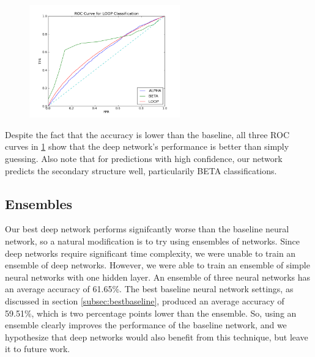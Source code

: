\documentclass[letterpaper,twocolumn,12pt]{article}
\begin{document}
\begin{figure}[ht!]
\centering
\includegraphics[width=65mm]{results/ROC_all_final_deep_net_100it.png}
\caption{}
\label{fig:roc}
\end{figure}

Despite the fact that the accuracy is lower than the baseline, all three ROC curves in \ref{fig:roc} show that the deep network's performance is better than simply guessing.
Also note that for predictions with high confidence, our network predicts the secondary structure well, particularily BETA classifications.

\subsection{Ensembles}
Our best deep network performs signifcantly worse than the baseline neural network, so a natural modification is to try using ensembles of networks.
Since deep networks require significant time complexity, we were unable to train an ensemble of deep networks.
However, we were able to train an ensemble of simple neural networks with one hidden layer.
An ensemble of three neural networks has an average accuracy of 61.65\%.
The best baseline neural network settings, as discussed in section \ref{subsec:bestbaseline},
produced an average accuracy of 59.51\%, which is two percentage points lower than the ensemble.
So, using an ensemble clearly improves the performance of the baseline network, and we hypothesize that deep networks would also benefit from this technique, but leave it to future work.


\end{document}
